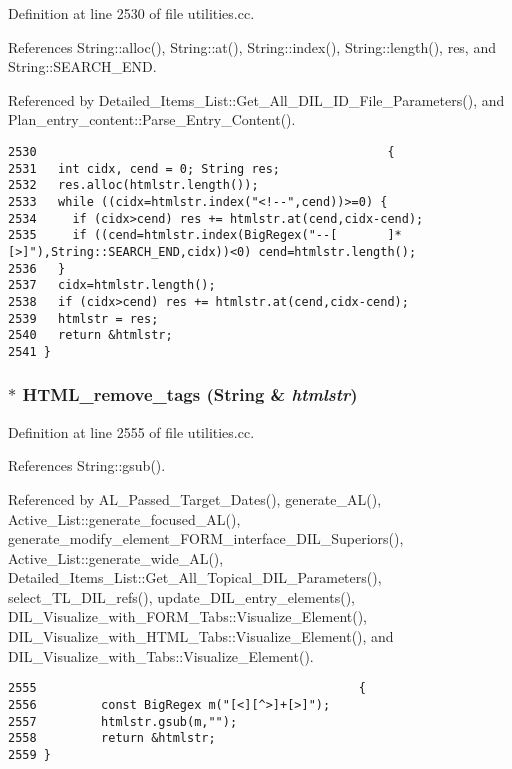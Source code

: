 Definition at line 2530 of file utilities.cc.

References String::alloc(), String::at(), String::index(), String::length(), res, and String::SEARCH\_\-END.

Referenced by Detailed\_\-Items\_\-List::Get\_\-All\_\-DIL\_\-ID\_\-File\_\-Parameters(), and Plan\_\-entry\_\-content::Parse\_\-Entry\_\-Content().



\footnotesize\begin{verbatim}2530                                                 {
2531   int cidx, cend = 0; String res;
2532   res.alloc(htmlstr.length());
2533   while ((cidx=htmlstr.index("<!--",cend))>=0) {
2534     if (cidx>cend) res += htmlstr.at(cend,cidx-cend);
2535     if ((cend=htmlstr.index(BigRegex("--[       ]*[>]"),String::SEARCH_END,cidx))<0) cend=htmlstr.length();
2536   }
2537   cidx=htmlstr.length();
2538   if (cidx>cend) res += htmlstr.at(cend,cidx-cend);
2539   htmlstr = res;
2540   return &htmlstr;
2541 }
\end{verbatim}\normalsize 
{}
\subsubsection{$\ast$ HTML\_\-remove\_\-tags ({\bf String} \& {\em htmlstr})}\label{utilities_8cc_a62}




Definition at line 2555 of file utilities.cc.

References String::gsub().

Referenced by AL\_\-Passed\_\-Target\_\-Dates(), generate\_\-AL(), Active\_\-List::generate\_\-focused\_\-AL(), generate\_\-modify\_\-element\_\-FORM\_\-interface\_\-DIL\_\-Superiors(), Active\_\-List::generate\_\-wide\_\-AL(), Detailed\_\-Items\_\-List::Get\_\-All\_\-Topical\_\-DIL\_\-Parameters(), select\_\-TL\_\-DIL\_\-refs(), update\_\-DIL\_\-entry\_\-elements(), DIL\_\-Visualize\_\-with\_\-FORM\_\-Tabs::Visualize\_\-Element(), DIL\_\-Visualize\_\-with\_\-HTML\_\-Tabs::Visualize\_\-Element(), and DIL\_\-Visualize\_\-with\_\-Tabs::Visualize\_\-Element().



\footnotesize\begin{verbatim}2555                                             {
2556         const BigRegex m("[<][^>]+[>]");
2557         htmlstr.gsub(m,"");
2558         return &htmlstr;
2559 }
\end{verbatim}\normalsize 
{}
